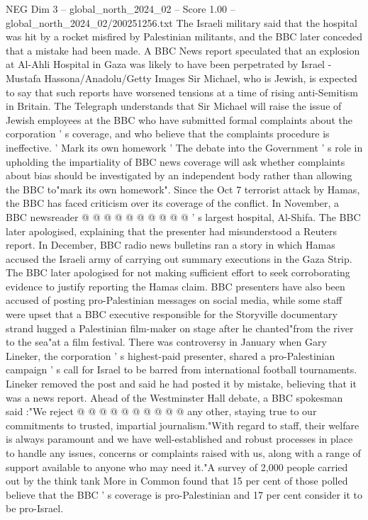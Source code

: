 \begin{textsample}{NEG Dim 3 – global\_north\_2024\_02 – Score 1.00 – global\_north\_2024\_02/200251256.txt}  \label{ex:f3_neg_204}
The Israeli military said that the hospital was hit by a rocket misfired by Palestinian militants, and the BBC later conceded that a mistake had been made.
A BBC News report speculated that an explosion at Al-Ahli Hospital in Gaza was likely to have been perpetrated by Israel - Mustafa Hassona/Anadolu/Getty Images Sir Michael, who is Jewish, is expected to say that such reports have worsened tensions at a time of rising anti-Semitism in Britain.
The Telegraph understands that Sir Michael will raise the issue of Jewish employees at the BBC who have submitted formal complaints about the corporation ' s coverage, and who believe that the complaints procedure is ineffective. ' Mark its own homework ' The debate into the Government ' s role in upholding the impartiality of BBC news coverage will ask whether complaints about bias should be investigated by an independent body rather than allowing the BBC to"mark its own homework".
Since the Oct 7 terrorist attack by Hamas, the BBC has faced criticism over its coverage of the conflict.
In November, a BBC newsreader @ @ @ @ @ @ @ @ @ @ ' s largest hospital, Al-Shifa.
The BBC later apologised, explaining that the presenter had misunderstood a Reuters report.
In December, BBC radio news bulletins ran a story in which Hamas accused the Israeli army of carrying out summary executions in the Gaza Strip.
The BBC later apologised for not making sufficient effort to seek corroborating evidence to justify reporting the Hamas claim.
BBC presenters have also been accused of posting pro-Palestinian messages on social media, while some staff were upset that a BBC executive responsible for the Storyville documentary strand hugged a Palestinian film-maker on stage after he chanted"from the river to the sea"at a film festival.
There was controversy in January when Gary Lineker, the corporation ' s highest-paid presenter, shared a pro-Palestinian campaign ' s call for Israel to be barred from international football tournaments.
Lineker removed the post and said he had posted it by mistake, believing that it was a news report.
Ahead of the Westminster Hall debate, a BBC spokesman said :"We reject @ @ @ @ @ @ @ @ @ @ any other, staying true to our commitments to trusted, impartial journalism."With regard to staff, their welfare is always paramount and we have well-established and robust processes in place to handle any issues, concerns or complaints raised with us, along with a range of support available to anyone who may need it."A survey of 2,000 people carried out by the think tank More in Common found that 15 per cent of those polled believe that the BBC ' s coverage is pro-Palestinian and 17 per cent consider it to be pro-Israel.

\end{textsample}
